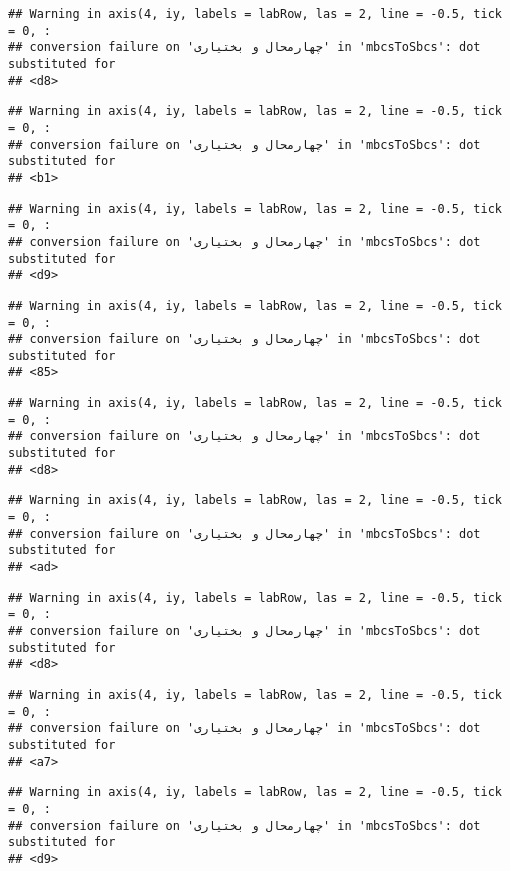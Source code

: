 \documentclass[
]{article}
\begin{document}
\begin{verbatim}
## Warning in axis(4, iy, labels = labRow, las = 2, line = -0.5, tick = 0, :
## conversion failure on 'چهارمحال و بختیاری' in 'mbcsToSbcs': dot substituted for
## <d8>
\end{verbatim}

\begin{verbatim}
## Warning in axis(4, iy, labels = labRow, las = 2, line = -0.5, tick = 0, :
## conversion failure on 'چهارمحال و بختیاری' in 'mbcsToSbcs': dot substituted for
## <b1>
\end{verbatim}

\begin{verbatim}
## Warning in axis(4, iy, labels = labRow, las = 2, line = -0.5, tick = 0, :
## conversion failure on 'چهارمحال و بختیاری' in 'mbcsToSbcs': dot substituted for
## <d9>
\end{verbatim}

\begin{verbatim}
## Warning in axis(4, iy, labels = labRow, las = 2, line = -0.5, tick = 0, :
## conversion failure on 'چهارمحال و بختیاری' in 'mbcsToSbcs': dot substituted for
## <85>
\end{verbatim}

\begin{verbatim}
## Warning in axis(4, iy, labels = labRow, las = 2, line = -0.5, tick = 0, :
## conversion failure on 'چهارمحال و بختیاری' in 'mbcsToSbcs': dot substituted for
## <d8>
\end{verbatim}

\begin{verbatim}
## Warning in axis(4, iy, labels = labRow, las = 2, line = -0.5, tick = 0, :
## conversion failure on 'چهارمحال و بختیاری' in 'mbcsToSbcs': dot substituted for
## <ad>
\end{verbatim}

\begin{verbatim}
## Warning in axis(4, iy, labels = labRow, las = 2, line = -0.5, tick = 0, :
## conversion failure on 'چهارمحال و بختیاری' in 'mbcsToSbcs': dot substituted for
## <d8>
\end{verbatim}

\begin{verbatim}
## Warning in axis(4, iy, labels = labRow, las = 2, line = -0.5, tick = 0, :
## conversion failure on 'چهارمحال و بختیاری' in 'mbcsToSbcs': dot substituted for
## <a7>
\end{verbatim}

\begin{verbatim}
## Warning in axis(4, iy, labels = labRow, las = 2, line = -0.5, tick = 0, :
## conversion failure on 'چهارمحال و بختیاری' in 'mbcsToSbcs': dot substituted for
## <d9>
\end{verbatim}
\end{document}
